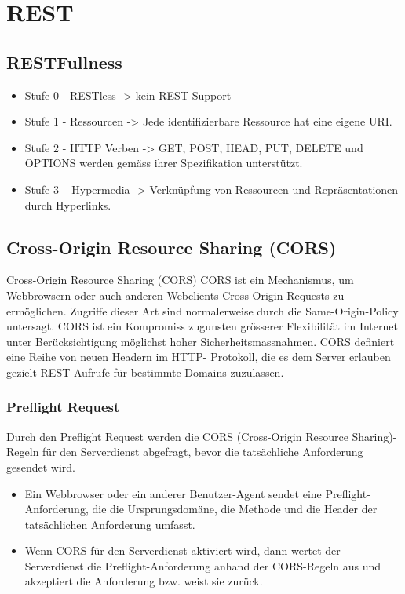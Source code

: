 \section{REST}
\subsection{RESTFullness}
\begin{itemize}
	\item Stufe 0 - RESTless -> kein REST Support
	\item Stufe 1 - Ressourcen -> Jede identifizierbare Ressource hat eine eigene URI.
	\item Stufe 2 - HTTP Verben -> GET, POST, HEAD, PUT, DELETE und OPTIONS werden gemäss ihrer
Spezifikation unterstützt.
	\item Stufe 3 – Hypermedia -> Verknüpfung von Ressourcen und Repräsentationen durch Hyperlinks.
\end{itemize}

\subsection{Cross-Origin Resource Sharing (CORS)}
Cross-Origin Resource Sharing (CORS)
CORS ist ein Mechanismus, um Webbrowsern oder auch anderen Webclients Cross-Origin-Requests zu ermöglichen. Zugriffe dieser Art sind normalerweise durch die Same-Origin-Policy untersagt. CORS ist ein Kompromiss zugunsten grösserer Flexibilität im Internet unter Berücksichtigung möglichst hoher Sicherheitsmassnahmen.
CORS definiert eine Reihe von neuen Headern im HTTP- Protokoll, die es dem Server erlauben gezielt REST-Aufrufe für bestimmte Domains zuzulassen.

\subsubsection{Preflight Request}

Durch den Preflight Request werden die CORS (Cross-Origin Resource Sharing)-Regeln für den Serverdienst abgefragt, bevor die tatsächliche Anforderung gesendet wird.
\begin{itemize}
	\item Ein Webbrowser oder ein anderer Benutzer-Agent sendet eine Preflight- Anforderung, die die Ursprungsdomäne, die Methode und die Header der tatsächlichen Anforderung umfasst.
	\item Wenn CORS für den Serverdienst aktiviert wird, dann wertet der Serverdienst die Preflight-Anforderung anhand der CORS-Regeln aus und akzeptiert die Anforderung bzw. weist sie zurück.
\end{itemize}

